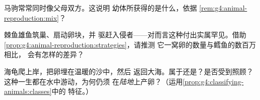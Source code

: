 \begin{exercise}[$\star\star$]\label{exo:g4:animal-reproduction:9}
马驹常常同时像父母双方。这说明
幼体所获得的是什么，依据
\cref{rem:g4:animal-reproduction:mix}？
\end{exercise}

\begin{exercise}[$\star\star$]\label{exo:g4:animal-reproduction:10}
棘鱼雄鱼筑巢、扇动卵块，并
驱赶入侵者——对而言这种付出实属罕见。借助
\cref{prop:g4:animal-reproduction:strategies}，请推测
它一窝卵的数量与鳕鱼的数百万相比，
会有怎样的差异？
\end{exercise}

\begin{exercise}[$\star\star\star$]\label{exo:g4:animal-reproduction:11}
海龟爬上岸，把卵埋在温暖的沙中，然后
返回大海。属于还是？是否受到照顾？
这种一生都在水中游动，为何仍须
在\emph{陆地}上产卵？（运用\cref{prop:g4:classifying-animals:classes}中的
特征。）
\end{exercise}
